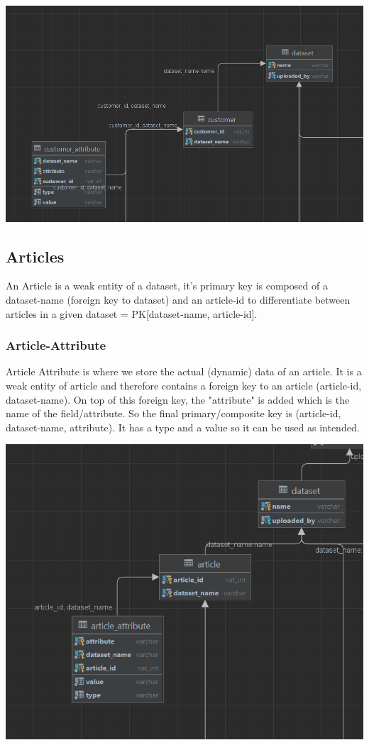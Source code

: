\documentclass[a4paper,12pt]{article}
\begin{document}
	\begin{center}
		  		\includegraphics[width=\textwidth]{Customer.png}
	\end{center}
	\pagebreak
	\subsection{Articles}
		An Article is a weak entity of a dataset, it's primary key is composed of a dataset-name (foreign key to dataset) and an article-id to differentiate between articles in a given dataset = PK[dataset-name, article-id].
		\subsubsection{Article-Attribute}
			Article Attribute is where we store the actual (dynamic) data of an article. It is a weak entity of article and therefore contains a foreign key to an article (article-id, dataset-name). On top of this foreign key, the "attribute" is added which is the name of the field/attribute. So the final primary/composite key is (article-id, dataset-name, attribute). It has a type and a value so it can be used as intended.
	\begin{center}
		  		\includegraphics[width=\textwidth]{Article.png}
	\end{center}
	\pagebreak	
\end{document}
